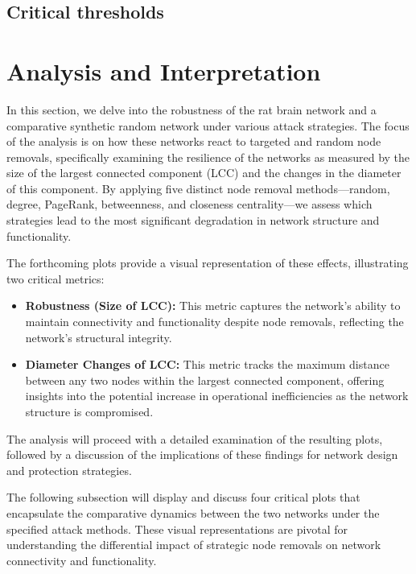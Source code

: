 \documentclass[
	report, %
	11pt, %
]{CSUniSchoolLabReport}
\newcounter{ct}
\newcommand{\csvtable}[3]{%
\begin{table}[H]
    \centering
    \rowcolors{3}{white}{lightgray}  %
    \csvreader[%
        tabular=|c|c|,
        table head=\hline \rowcolor{SeaGreen} #3 \\\hline,  %
        late after line=\\\hline,
        before reading={\rowcolors{3}{white}{lightgray}}  %
    ]%
    {#1}{1=\Node, 2=\Score}%
    {\Node & \Score}  %
    \caption{#2}
\end{table}
}
\begin{document}
\subsection{Critical thresholds}


\section{Analysis and Interpretation}

In this section, we delve into the robustness of the rat brain network and a comparative synthetic random network under various attack strategies. The focus of the analysis is on how these networks react to targeted and random node removals, specifically examining the resilience of the networks as measured by the size of the largest connected component (LCC) and the changes in the diameter of this component. By applying five distinct node removal methods—random, degree, PageRank, betweenness, and closeness centrality—we assess which strategies lead to the most significant degradation in network structure and functionality.\par

The forthcoming plots provide a visual representation of these effects, illustrating two critical metrics:
\begin{itemize}
	\item \textbf{Robustness (Size of LCC):} This metric captures the network's ability to maintain connectivity and functionality despite node removals, reflecting the network's structural integrity.
	\item  \textbf{Diameter Changes of LCC:} This metric tracks the maximum distance between any two nodes within the largest connected component, offering insights into the potential increase in operational inefficiencies as the network structure is compromised.
\end{itemize}



The analysis will proceed with a detailed examination of the resulting plots, followed by a discussion of the implications of these findings for network design and protection strategies.

The following subsection will display and discuss four critical plots that encapsulate the comparative dynamics between the two networks under the specified attack methods. These visual representations are pivotal for understanding the differential impact of strategic node removals on network connectivity and functionality.
\pagebreak
\end{document}
